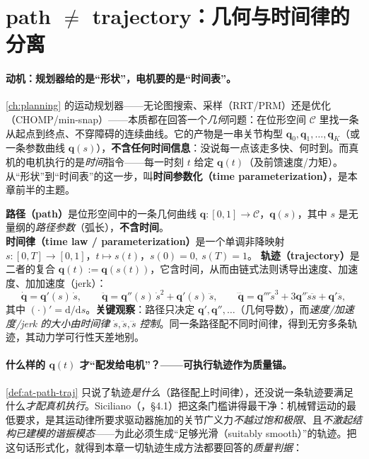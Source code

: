 \section{path \texorpdfstring{$\ne$}{!=} trajectory：几何与时间律的分离}
\label{sec:at-path-vs-traj}

\paragraph{动机：规划器给的是“形状”，电机要的是“时间表”。}
\cref{ch:planning} 的运动规划器——无论图搜索、采样（RRT/PRM）还是优化（CHOMP/min-snap）——本质都在回答一个\emph{几何}问题：在位形空间 $\mathcal{C}$ 里找一条从起点到终点、不穿障碍的连续曲线。它的产物是一串关节构型 $\mathbf{q}_0,\mathbf{q}_1,\dots,\mathbf{q}_K$（或一条参数曲线 $\mathbf{q}(s)$），\textbf{不含任何时间信息}：没说每一点该走多快、何时到。而真机的电机执行的是\emph{时间}指令——每一时刻 $t$ 给定 $\mathbf{q}(t)$（及前馈速度/力矩）。从“形状”到“时间表”的这一步，叫\textbf{时间参数化（time parameterization）}，是本章前半的主题。

\begin{definition}[路径与轨迹]\label{def:at-path-traj}
\textbf{路径（path）}是位形空间中的一条几何曲线 $\mathbf{q}:[0,1]\to\mathcal{C}$，$\mathbf{q}(s)$，其中 $s$ 是无量纲的\emph{路径参数}（弧长），\textbf{不含时间}。
\textbf{时间律（time law / parameterization）}是一个单调非降映射 $s:[0,T]\to[0,1]$，$t\mapsto s(t)$，$s(0)=0,\ s(T)=1$。
\textbf{轨迹（trajectory）}是二者的复合 $\mathbf{q}(t):=\mathbf{q}(s(t))$，它含时间，从而由链式法则诱导出速度、加速度、加加速度（jerk）：
\begin{equation}
  \dot{\mathbf{q}}=\mathbf{q}'(s)\,\dot{s},\qquad
  \ddot{\mathbf{q}}=\mathbf{q}''(s)\,\dot{s}^2+\mathbf{q}'(s)\,\ddot{s},\qquad
  \dddot{\mathbf{q}}=\mathbf{q}'''\dot{s}^3+3\mathbf{q}''\dot{s}\ddot{s}+\mathbf{q}'\dddot{s},
  \label{eq:at-chain}
\end{equation}
其中 $(\cdot)'=\mathrm{d}/\mathrm{d}s$。\textbf{关键观察}：路径只决定 $\mathbf{q}',\mathbf{q}'',\dots$（几何导数），而\emph{速度/加速度/jerk 的大小由时间律 $\dot s,\ddot s,\dddot s$ 控制}。同一条路径配不同时间律，得到无穷多条轨迹，其动力学可行性天差地别。
\end{definition}

\paragraph{什么样的 \texorpdfstring{$\mathbf{q}(t)$}{q(t)} 才“配发给电机”？——可执行轨迹作为质量锚。}
\cref{def:at-path-traj} 只说了轨迹\emph{是什么}（路径配上时间律），还没说一条轨迹要满足什么\emph{才配真机执行}。Siciliano（\cite{siciliano2009robotics}，§4.1）把这条门槛讲得最干净：机械臂运动的最低要求，是其运动律所要求驱动器施加的关节广义力\emph{不越过饱和极限}、且\emph{不激起结构已建模的谐振模态}——为此必须生成“足够光滑（suitably smooth）”的轨迹。把这句话形式化，就得到本章一切轨迹生成方法都要回答的\emph{质量判据}：

